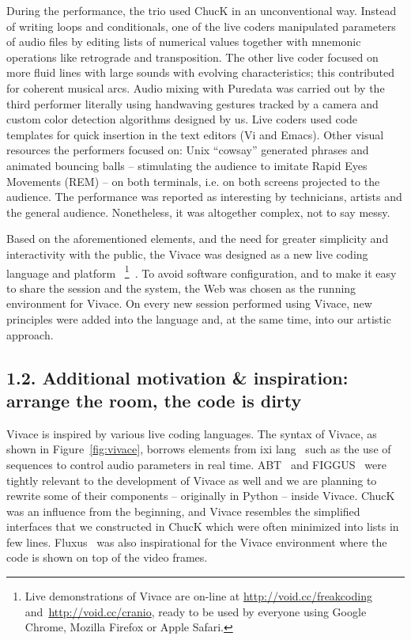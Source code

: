\documentclass[12pt,times,twocolumn]{article}
\begin{document}
During the performance, the trio used ChucK in an unconventional
way. Instead of writing loops and conditionals, one of the live coders
manipulated parameters of audio files by editing lists of numerical
values together with mnemonic operations like retrograde and
transposition. The other live coder focused on more fluid lines with
large sounds with evolving characteristics; this contributed for coherent
musical arcs. Audio mixing with Puredata was carried out by
the third performer literally using handwaving gestures tracked by a
camera and custom color detection algorithms designed by us. Live coders
used code templates for quick insertion in the text editors (Vi
and Emacs).
Other visual resources the performers focused on:
Unix ``cowsay'' generated phrases and animated bouncing balls
-- stimulating the audience to imitate Rapid Eyes
Movements (REM) -- on both terminals, i.e. on both screens projected to the audience.
The performance was reported as interesting by technicians,
artists and the general audience.
Nonetheless, it was altogether complex, not to say messy.

Based on the aforementioned elements, and the need for greater simplicity
and interactivity with the public, the Vivace was designed as a new live coding language and platform
~\footnote{Live demonstrations of Vivace are on-line at
    \url{http://void.cc/freakcoding} and~\url{http://void.cc/cranio},
    ready to be used by everyone using
  Google Chrome, Mozilla Firefox or Apple Safari.}~\cite{vivace}. To avoid software
configuration, and to make it easy to share the session and the
system, the Web was chosen as the running
environment for Vivace. On every new session performed using Vivace,
new principles were added into the language and, at the same time,
into our artistic approach.

\subsection{1.2. Additional motivation \& inspiration: arrange the room, the code is dirty}
Vivace is inspired by various live coding languages. The syntax of
Vivace, as shown in Figure~\ref{fig:vivace}, borrows elements from ixi
lang~\cite{magnusson2011ixi} such as the use of sequences to control
audio parameters in real time. ABT~\cite{fabbri} and
FIGGUS~\cite{fabbri2} were tightly relevant to the development of
Vivace as well and we are planning to rewrite some of their components
-- originally in Python -- inside Vivace.
ChucK was an influence from the beginning, and Vivace resembles the simplified
interfaces that we constructed in ChucK which were often minimized into lists in few lines.
Fluxus~\cite{fluxus} was also inspirational for the Vivace
environment where the code is shown on top of the video frames.
\end{document}
